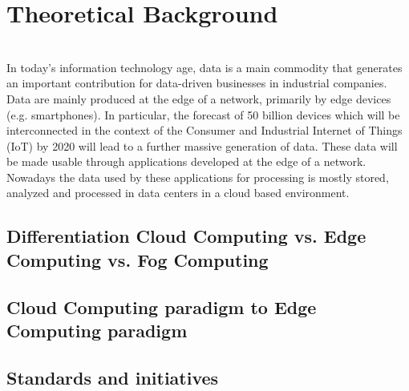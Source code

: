 \section{Theoretical Background}\label{sec:background}
 
\\

In today's information technology age, data is a main commodity that generates an important contribution for data-driven businesses in industrial companies. Data are mainly produced at the edge of a network, primarily by edge devices (e.g. smartphones). In particular, the forecast of 50 billion devices which will be interconnected in the context of the Consumer and Industrial Internet of Things (IoT) by 2020 will lead to a further massive generation of data. These data will be made usable through applications developed at the edge of a network. Nowadays the data used by these applications for processing is mostly stored, analyzed and processed in data centers in a cloud based environment.

\subsection{Differentiation Cloud Computing vs. Edge Computing vs. Fog Computing}

\subsection{Cloud Computing paradigm to Edge Computing paradigm}

\subsection{Standards and initiatives}
